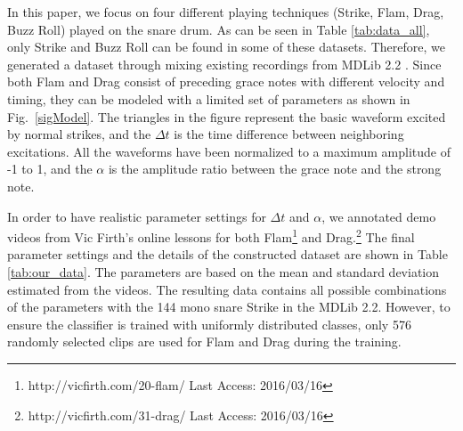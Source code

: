 \documentclass{article}
\begin{document}
In this paper, we focus on four different playing techniques (Strike, Flam, Drag, Buzz Roll) played on the snare drum. As can be seen in Table \ref{tab:data_all}, only Strike and Buzz Roll can be found in some of these datasets. Therefore, we generated a dataset through mixing existing recordings from MDLib 2.2 \cite{Prockup2013}. Since both Flam and Drag consist of preceding grace notes with different velocity and timing, they can be modeled with a limited set of parameters as shown in Fig.~\ref{sigModel}. The triangles in the figure represent the basic waveform excited by normal strikes, and the $\Delta t$ is the time difference between neighboring excitations. All the waveforms have been normalized to a maximum amplitude of -1 to 1, and the $\alpha$ is the amplitude ratio between the grace note and the strong note. 

In order to have realistic parameter settings for $\Delta t$ and $\alpha$, we annotated demo videos from Vic Firth's online lessons for both Flam\footnote{http://vicfirth.com/20-flam/ Last Access: 2016/03/16} and Drag.\footnote{http://vicfirth.com/31-drag/ Last Access: 2016/03/16} The final parameter settings and the details of the constructed dataset are shown in Table \ref{tab:our_data}. The parameters are based on the mean and standard deviation estimated from the videos. The resulting data contains all possible combinations of the parameters with the 144 mono snare Strike in the MDLib 2.2. However, to ensure the classifier is trained with uniformly distributed classes, only 576 randomly selected clips are used for Flam and Drag during the training.
\end{document}
